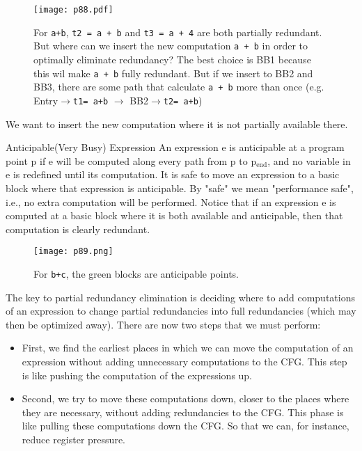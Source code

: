 \begin{figure}[H]
    \centering
     \texttt{[image: p88.pdf]}
         \caption{For \texttt{a+b}, \texttt{t2 = a + b} and \texttt{t3 = a + 4} are both partially redundant. But where can we insert the new computation \texttt{a + b} in order to optimally eliminate redundancy?
         The best choice is BB1 because this wil  make \texttt{a + b} fully redundant. But if we insert to BB2 and BB3, there are some path that calculate \texttt{a + b} more than once (e.g. Entry$\rightarrow$\texttt{t1= a+b} $\rightarrow$ BB2$\rightarrow$\texttt{t2= a+b}) }
         \label{fig:p88}
\end{figure}

We want to insert the new computation where it is not partially available there.


\begin{definition}{Anticipable(Very Busy) Expression}
    An	expression	e	is	anticipable	at	a	program	point	p	
    if	e will	be	computed	along	every	path	from	
    p	to	p$_{\mathrm{end}}$,	and	no	 variable	in	e	is	
    redefined	until	its	computation. It	is	safe	to	move	
    an	expression	to	a	basic	block	where	
    that	expression	is	anticipable. By	"safe"	we	mean	
    "performance	safe",	i.e.,	no	extra computation	
    will	be	performed.	Notice	that	if	an	expression	
    e	is	computed	at	a	basic block	where	it	is	both     available
    and	anticipable,	then	that	
    computation	is	clearly	redundant.		

    \begin{figure}[H]
        \centering
         \texttt{[image: p89.png]}
             \caption{For \texttt{b+c}, the {\color{green}green} blocks are anticipable points. }
             \label{fig:p89}
    \end{figure}
\end{definition}



The key to partial redundancy
elimination is deciding where to add
computations of an expression to
change partial redundancies into full
redundancies (which may then be
optimized away). There	are	now	two	steps	that	we	must	
perform:

\begin{itemize}
\item First,	we	find	the	earliest	places	in	which	
we	can	move	the	computation	of	an	
expression	without	adding	unnecessary	
computations	to	the	CFG.	This	step	is	like	
pushing	the	computation	of	the	
expressions	up.	
\item Second,	we	try	to	move	these	
computations	down,	closer	to	the	places	
where	they	are	necessary,	without	adding	
redundancies	to	the	CFG.	This	phase	is	like	
pulling	these	computations	down	the	CFG. So	that	we	can,	
for	instance,	reduce	register	
pressure.
\end{itemize}

